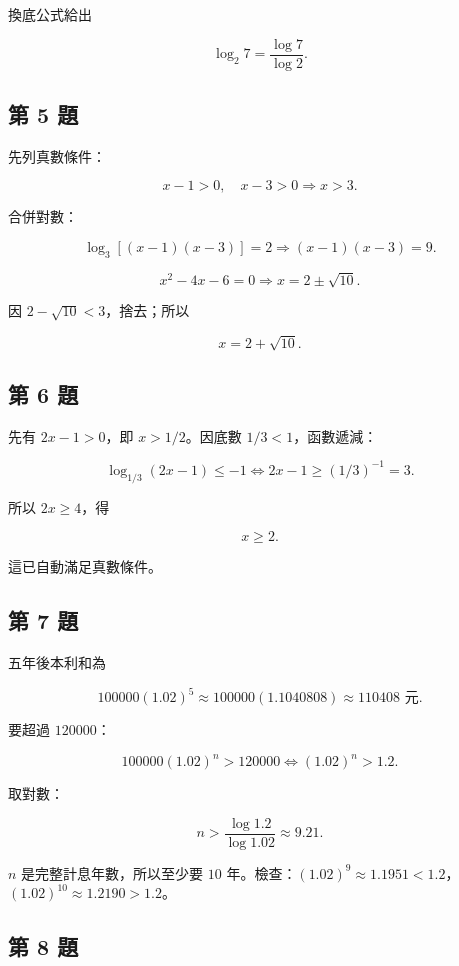 \documentclass[11pt,a4paper]{article}
\begin{document}
換底公式給出

\[
\boxed{\log_2 7=\frac{\log7}{\log2}}.
\]

\subsection{第 5 題}\label{ux7b2c-5-ux984c}

先列真數條件：

\[
x-1>0,\quad x-3>0
\Rightarrow x>3.
\]

合併對數：

\[
\log_3[(x-1)(x-3)]=2
\Rightarrow(x-1)(x-3)=9.
\]

\[
x^2-4x-6=0
\Rightarrow
x=2\pm\sqrt{10}.
\]

因 \(2-\sqrt{10}<3\)，捨去；所以

\[
\boxed{x=2+\sqrt{10}}.
\]

\subsection{第 6 題}\label{ux7b2c-6-ux984c}

先有 \(2x-1>0\)，即 \(x>1/2\)。因底數 \(1/3<1\)，函數遞減：

\[
\log_{1/3}(2x-1)\le-1
\iff
2x-1\ge(1/3)^{-1}=3.
\]

所以 \(2x\ge4\)，得

\[
\boxed{x\ge2}.
\]

這已自動滿足真數條件。

\subsection{第 7 題}\label{ux7b2c-7-ux984c}

五年後本利和為

\[
100000(1.02)^5
\approx100000(1.1040808)
\approx\boxed{110408\text{ 元}}.
\]

要超過 \(120000\)：

\[
100000(1.02)^n>120000
\iff
(1.02)^n>1.2.
\]

取對數：

\[
n>\frac{\log1.2}{\log1.02}
\approx9.21.
\]

\(n\) 是完整計息年數，所以至少要 \(\boxed{10\text{ 年}}\)。檢查：\((1.02)^9\approx1.1951<1.2\)，\((1.02)^{10}\approx1.2190>1.2\)。

\subsection{第 8 題}\label{ux7b2c-8-ux984c}
\end{document}

